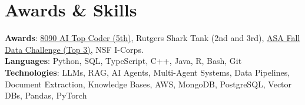 \documentclass[letterpaper,11pt]{article}
\begin{document}
\section{Awards \& Skills}
 \begin{itemize}[leftmargin=0.15in, label={}]
    \small{\item{
     \textbf{Awards}{: \href{https://github.com/AkeBoss-tech/top-coder-challenge}{8090 AI Top Coder (5th)}, Rutgers Shark Tank (2nd and 3rd), \href{https://acashmoney.biz/portfolio/asa-fall-data/}{ASA Fall Data Challenge (Top 3)}, NSF I-Corps.} \\
     \textbf{Languages}{: Python, SQL, TypeScript, C++, Java, R, Bash, Git} \\
     \textbf{Technologies}{: LLMs, RAG, AI Agents, Multi-Agent Systems, Data Pipelines, Document Extraction, Knowledge Bases, AWS, MongoDB, PostgreSQL, Vector DBs, Pandas, PyTorch}
    }}
 \end{itemize}
\end{document}
